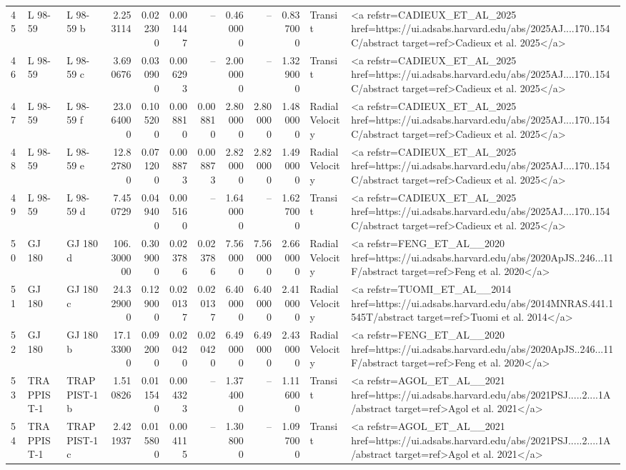\begin{tabular}{lllrrrrrrrll}
45 & L 98-59 & L 98-59 b & 2.253114 & 0.022300 & 0.001447 & -- & 0.460000 & -- & 0.837000 & Transit & <a refstr=CADIEUX_ET_AL_2025 href=https://ui.adsabs.harvard.edu/abs/2025AJ....170..154C/abstract target=ref>Cadieux et al. 2025</a> \\
46 & L 98-59 & L 98-59 c & 3.690676 & 0.030900 & 0.006293 & -- & 2.000000 & -- & 1.329000 & Transit & <a refstr=CADIEUX_ET_AL_2025 href=https://ui.adsabs.harvard.edu/abs/2025AJ....170..154C/abstract target=ref>Cadieux et al. 2025</a> \\
47 & L 98-59 & L 98-59 f & 23.064000 & 0.105200 & 0.008810 & 0.008810 & 2.800000 & 2.800000 & 1.480000 & Radial Velocity & <a refstr=CADIEUX_ET_AL_2025 href=https://ui.adsabs.harvard.edu/abs/2025AJ....170..154C/abstract target=ref>Cadieux et al. 2025</a> \\
48 & L 98-59 & L 98-59 e & 12.827800 & 0.071200 & 0.008873 & 0.008873 & 2.820000 & 2.820000 & 1.490000 & Radial Velocity & <a refstr=CADIEUX_ET_AL_2025 href=https://ui.adsabs.harvard.edu/abs/2025AJ....170..154C/abstract target=ref>Cadieux et al. 2025</a> \\
49 & L 98-59 & L 98-59 d & 7.450729 & 0.049400 & 0.005160 & -- & 1.640000 & -- & 1.627000 & Transit & <a refstr=CADIEUX_ET_AL_2025 href=https://ui.adsabs.harvard.edu/abs/2025AJ....170..154C/abstract target=ref>Cadieux et al. 2025</a> \\
50 & GJ 180 & GJ 180 d & 106.300000 & 0.309000 & 0.023786 & 0.023786 & 7.560000 & 7.560000 & 2.660000 & Radial Velocity & <a refstr=FENG_ET_AL__2020 href=https://ui.adsabs.harvard.edu/abs/2020ApJS..246...11F/abstract target=ref>Feng et al. 2020</a> \\
51 & GJ 180 & GJ 180 c & 24.329000 & 0.129000 & 0.020137 & 0.020137 & 6.400000 & 6.400000 & 2.410000 & Radial Velocity & <a refstr=TUOMI_ET_AL__2014 href=https://ui.adsabs.harvard.edu/abs/2014MNRAS.441.1545T/abstract target=ref>Tuomi et al. 2014</a> \\
52 & GJ 180 & GJ 180 b & 17.133000 & 0.092000 & 0.020420 & 0.020420 & 6.490000 & 6.490000 & 2.430000 & Radial Velocity & <a refstr=FENG_ET_AL__2020 href=https://ui.adsabs.harvard.edu/abs/2020ApJS..246...11F/abstract target=ref>Feng et al. 2020</a> \\
53 & TRAPPIST-1 & TRAPPIST-1 b & 1.510826 & 0.011540 & 0.004323 & -- & 1.374000 & -- & 1.116000 & Transit & <a refstr=AGOL_ET_AL__2021 href=https://ui.adsabs.harvard.edu/abs/2021PSJ.....2....1A/abstract target=ref>Agol et al. 2021</a> \\
54 & TRAPPIST-1 & TRAPPIST-1 c & 2.421937 & 0.015800 & 0.004115 & -- & 1.308000 & -- & 1.097000 & Transit & <a refstr=AGOL_ET_AL__2021 href=https://ui.adsabs.harvard.edu/abs/2021PSJ.....2....1A/abstract target=ref>Agol et al. 2021</a> \\

\end{tabular}
